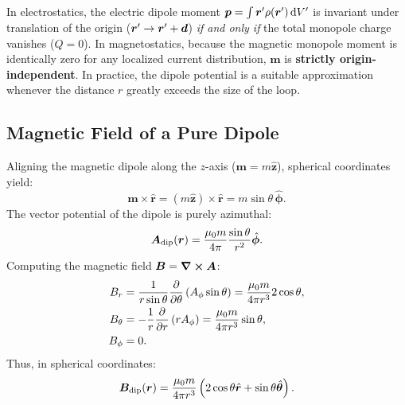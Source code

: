 \begin{remark}
    In electrostatics, the electric dipole moment $\bm{p} = \int \bm{r}' \rho(\bm{r}')\dd{V'}$ is invariant under translation of the origin ($\bm{r}' \to \bm{r}' + \bm{d}$) \emph{if and only if} the total monopole charge vanishes ($Q = 0$). In magnetostatics, because the magnetic monopole moment is identically zero for any localized current distribution, $\bm{m}$ is \textbf{strictly origin-independent}. In practice, the dipole potential is a suitable approximation whenever the distance $r$ greatly exceeds the size of the loop.
\end{remark}

\subsection{Magnetic Field of a Pure Dipole}

Aligning the magnetic dipole along the $z$-axis ($\bm{m} = m \hat{\bm{z}}$), spherical coordinates yield:
\begin{equation}
    \bm{m}\times \hat{\bm{r}} = (m\hat{\bm{z}})\times \hat{\bm{r}} = m\sin\theta\,\hat{\bm{\phi}}.
\end{equation}
The vector potential of the dipole is purely azimuthal:
\begin{equation}
    \bm{A}_{\text{dip}}(\bm{r}) = \frac{\mu_0 m}{4\pi} \frac{\sin\theta}{r^2} \hat{\bm{\phi}}.
\end{equation}
Computing the magnetic field $\bm{B} = \curl \bm{A}$:
\begin{align}
    B_r &= \frac{1}{r\sin\theta} \pdv{\theta}\left(A_\phi \sin\theta\right) = \frac{\mu_0 m}{4\pi r^3} 2\cos\theta, \\
    B_\theta &= -\frac{1}{r}\pdv{r}\left(r A_\phi\right) = \frac{\mu_0 m}{4\pi r^3} \sin\theta, \\
    B_\phi &= 0.
\end{align}
Thus, in spherical coordinates:
\begin{equation}
    \bm{B}_{\text{dip}}(\bm{r}) = \frac{\mu_0 m}{4\pi r^3} \left(2\cos\theta \hat{\bm{r}} + \sin\theta \hat{\bm{\theta}}\right).
    \label{eq:B_dip_spherical}
\end{equation}

